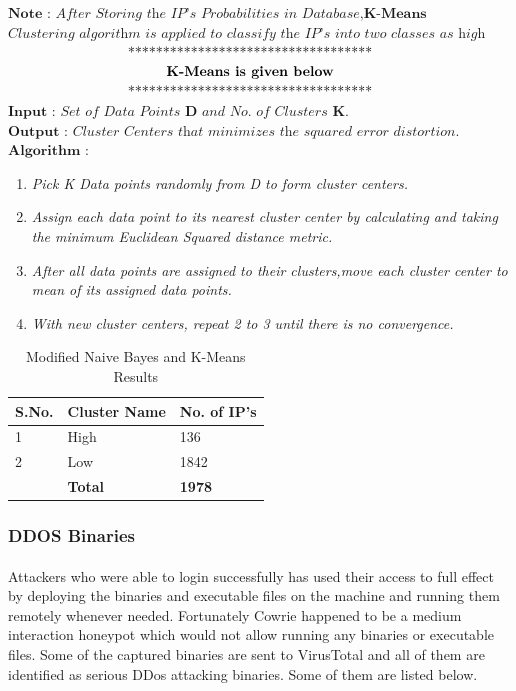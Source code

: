 \documentclass{report}
\begin{document}
\begin{algorithm}[H]
\begin{algorithmic}[1]
\State $\textbf{Note : }\textit{After Storing the IP's Probabilities in Database,}\textbf{K-Means} $ $\textit{Clustering algorithm is applied to classify the IP's into two classes as high and Low.}$
 $\centerline{***********************************}$
 $\textbf{\centerline{K-Means is given below}}$
 $\centerline{***********************************}$
\State $\textbf{Input : }\textit{Set of Data Points }\textbf{D}\textit{ and No. of Clusters}\textbf{ K.}$
\State $\textbf{Output : }\textit{Cluster Centers that minimizes the squared error distortion.}$
\State $\textbf{Algorithm : }$
\begin{enumerate}
   \item \textit{Pick K Data points randomly from D to form cluster centers.}
   \item \textit{Assign each data point to its nearest cluster center by calculating and taking the minimum Euclidean Squared distance metric.}
   \item \textit{After all data points are assigned to their clusters,move each cluster center to mean of its assigned data points.}
   \item \textit{With new cluster centers, repeat 2 to 3 until there is no convergence.}
\end{enumerate}
\end{algorithmic}
\end{algorithm}


\begin{table}[H]
\begin{tabular}{ |p{2cm}|p{5cm}|p{5cm}|  }
 \hline
 \textbf{S.No.} & \textbf{Cluster Name} & \textbf{No. of IP's}\\
 \hline
 \hline
 1 & High & 136 \\
 \hline
2 & Low & 1842 \\
\hline
\hline
 & \textbf{Total} & \textbf{1978} \\
\hline
\end{tabular}
 \caption{Modified Naive Bayes and K-Means Results}
\end{table}

\subsubsection{DDOS Binaries}
\paragraph{}
Attackers who were able to login successfully has used their access to full effect by deploying the binaries and executable files on the machine and running them remotely whenever needed. Fortunately Cowrie happened to be a medium interaction honeypot which would not allow running any binaries or executable files. Some of the captured binaries are sent to VirusTotal and all of them are identified as serious DDos attacking binaries. Some of them are listed below.
\end{document}

